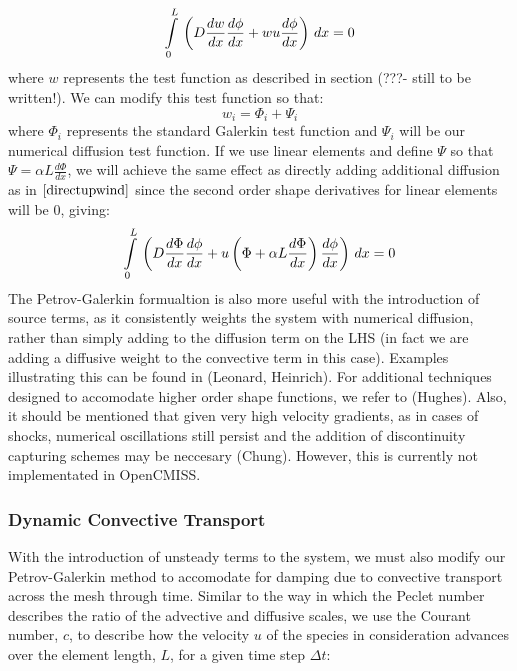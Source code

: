 \begin{equation}
   \displaystyle\int\limits_{0}^{L} \,\left( D\frac{dw}{dx}\frac{{d}\phi}{dx}+wu\frac{{d}\phi}{dx} \right)\,dx =0
\end{equation}
where $w$ represents the test function as described in section (???- still to be written!). We can modify this test function so that:
\begin{equation}
 w_i = \Phi_i + \Psi_i
\end{equation}
where $\Phi_i$ represents the standard Galerkin test function and $\Psi_i$ will be our numerical diffusion test function. If we use linear elements and define $\Psi$ so that $\Psi={\alpha}L\frac{d\Phi}{dx}$, we will achieve the same effect as directly adding additional diffusion as in $\eqref{directupwind}$ since the second order shape derivatives for linear elements will be 0, giving:
\begin{equation}
   \displaystyle\int\limits_{0}^{L} \,\left( D\frac{d\Phi}{dx}\frac{{d}\phi}{dx}+{u}\left( \Phi+{\alpha}L\frac{d\Phi}{dx} \right)\frac{{d}\phi}{dx} \right)\,dx =0
\end{equation}
The Petrov-Galerkin formualtion is also more useful with the introduction of source terms, as it consistently weights the system with numerical diffusion, rather than simply adding to the diffusion term on the LHS (in fact we are adding a diffusive weight to the convective term in this case). Examples illustrating this can be found in (Leonard, Heinrich). For additional techniques designed to accomodate higher order shape functions, we refer to (Hughes). Also, it should be mentioned that given very high velocity gradients, as in cases of shocks, numerical oscillations still persist and the addition of discontinuity capturing schemes may be neccesary (Chung). However, this is currently not implementated in OpenCMISS.

\subsubsection{Dynamic Convective Transport}

With the introduction of unsteady terms to the system, we must also modify our Petrov-Galerkin method to accomodate for damping due to convective transport across the mesh through time. Similar to the way in which the Peclet number describes the ratio of the advective and diffusive scales, we use the Courant number, $c$, to describe how the velocity $u$ of the species in consideration advances over the element length, $L$, for a given time step $\Delta{t}$:


